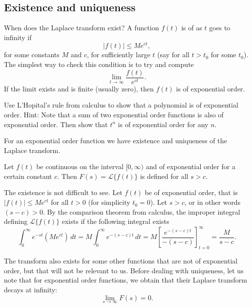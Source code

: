 \subsection{Existence and uniqueness}

When does the Laplace transform exist?  A function $f(t)$ is of
\emph{} as $t$ goes to infinity if
\begin{equation*}
\lvert f(t) \rvert \leq M e^{ct} ,
\end{equation*}
for some constants $M$ and $c$, for
sufficiently large $t$ (say for all $t > t_0$ for some $t_0$).  The simplest
way to check this condition is to try and compute
\begin{equation*}
\lim_{t\to \infty} \frac{f(t)}{e^{ct}} .
\end{equation*}
If the limit exists and is finite (usually zero), then $f(t)$ is of
exponential order.

\begin{exercise}
Use L'Hopital's rule from calculus to show that a polynomial is of
exponential order.  Hint: Note that a sum of two exponential order functions
is also of exponential order.  Then show that $t^n$ is of exponential order
for any $n$.
\end{exercise}

For an exponential order function we have existence and uniqueness of the
Laplace transform.

\begin{theorem}[Existence]
Let $f(t)$ be continuous on the interval $[0,\infty)$ and of exponential order for a certain
constant $c$.  Then $F(s) = \mathcal{L} \bigl\{ f(t) \bigr\}$ is defined for
all $s > c$.
\end{theorem}

The existence is not difficult to see.  Let $f(t)$ be of exponential order,
that is $\lvert f(t) \rvert \leq M e^{ct}$ for all $t > 0$ (for simplicity $t_0 = 0$).
Let $s > c$, or in other words $(s-c) > 0$.
By the comparison theorem from calculus, the improper integral defining
$\mathcal{L} \bigl\{ f(t) \bigr\}$ exists if the following integral exists
\begin{equation*}
\int_0^\infty e^{-st} ( M e^{ct} ) \,dt
=
M \int_0^\infty e^{-(s-c)t} \,dt = M \left[ \frac{e^{-(s-c)t}}{-(s-c)}
\right]_{t=0}^\infty = \frac{M}{s-c} .
\end{equation*}

The transform also exists for some other functions
that are not of exponential
order, but that will not be relevant to us.
Before dealing with uniqueness, let
us note that for exponential order functions, we obtain that their
Laplace transform decays at infinity:
\begin{equation*}
\lim_{s\to\infty} F(s) = 0 .
\end{equation*}

